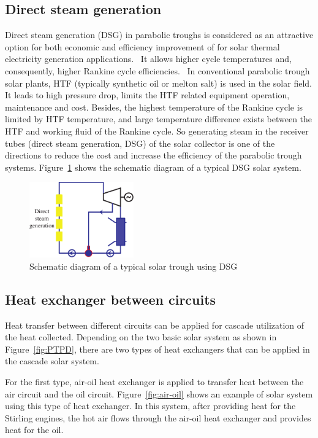 \subsection{Direct steam generation}

Direct steam generation (DSG) in parabolic troughs is considered as an attractive option for both economic and efficiency improvement of for solar thermal electricity generation applications.~\cite{Montes2011,Elsafi2015} It allows higher cycle temperatures and, consequently, higher Rankine cycle efficiencies.~\cite{Fraidenraich2013} In conventional parabolic trough solar plants, HTF (typically synthetic oil or melton salt) is used in the solar field. It leads to high pressure drop, limits the HTF related equipment operation, maintenance and cost. Besides, the highest temperature of the Rankine cycle is limited by HTF temperature, and large temperature difference exists between the HTF and working fluid of the Rankine cycle. So generating steam in the receiver tubes (direct steam generation, DSG) of the solar collector is one of the directions to reduce the cost and increase the efficiency of the parabolic trough systems. Figure~\ref{fig:DSG} shows the schematic diagram of a typical DSG solar system.

\begin{figure}[!ht]
\centering 
\includegraphics[width=0.4\textwidth]{fig/DSG}
\caption{Schematic diagram of a typical solar trough using DSG}\label{fig:DSG}
\end{figure}

\subsection{Heat exchanger between circuits}
\label{sec:hebc}

Heat transfer between different circuits can be applied for cascade utilization of the heat collected. Depending on the two basic solar system as shown in Figure~\ref{fig:PTPD}, there are two types of heat exchangers that can be applied in the cascade solar system.

For the first type, air-oil heat exchanger is applied to transfer heat between the air circuit and the oil circuit. Figure~\ref{fig:air-oil} shows an example of solar system using this type of heat exchanger. In this system, after providing heat for the Stirling engines, the hot air flows through the air-oil heat exchanger and provides heat for the oil. 

